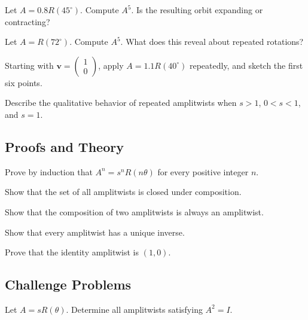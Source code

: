 \begin{exercise}
Let $A = 0.8R(45^\circ)$. Compute $A^5$. Is the resulting orbit
expanding or contracting?
\end{exercise}

\begin{exercise}
Let $A = R(72^\circ)$. Compute $A^5$. What does this reveal about
repeated rotations?
\end{exercise}

\begin{exercise}
Starting with $\mathbf v = \begin{pmatrix} 1\\ 0 \end{pmatrix}$, apply
$A = 1.1R(40^\circ)$ repeatedly, and sketch the first six points.
\end{exercise}

\begin{exercise}
Describe the qualitative behavior of repeated amplitwists when $s>1$,
$0<s<1$, and $s=1$.
\end{exercise}

\subsection*{Proofs and Theory}
\begin{exercise}
Prove by induction that $A^n = s^nR(n\theta)$ for every positive integer
$n$.
\end{exercise}

\begin{exercise}
Show that the set of all amplitwists is closed under composition.
\end{exercise}

\begin{exercise}
Show that the composition of two amplitwists is always an amplitwist.
\end{exercise}

\begin{exercise}
Show that every amplitwist has a unique inverse.
\end{exercise}

\begin{exercise}
Prove that the identity amplitwist is $(1,0)$.
\end{exercise}

\subsection*{Challenge Problems}
\begin{exercise}
Let $A = sR(\theta)$. Determine all amplitwists satisfying $A^2 = I$.
\end{exercise}

